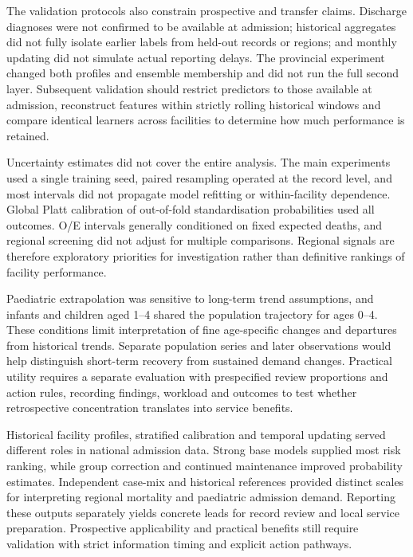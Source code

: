 \documentclass[11pt,a4paper]{article}
\newcommand{\mainheading}[1]{\par\needspace{4\baselineskip}\vspace{7pt}{\large\bfseries #1}\par\vspace{3pt}}
\begin{document}
The validation protocols also constrain prospective and transfer claims. Discharge diagnoses were not confirmed to be available at admission; historical aggregates did not fully isolate earlier labels from held-out records or regions; and monthly updating did not simulate actual reporting delays. The provincial experiment changed both profiles and ensemble membership and did not run the full second layer. Subsequent validation should restrict predictors to those available at admission, reconstruct features within strictly rolling historical windows and compare identical learners across facilities to determine how much performance is retained.

Uncertainty estimates did not cover the entire analysis. The main experiments used a single training seed, paired resampling operated at the record level, and most intervals did not propagate model refitting or within-facility dependence. Global Platt calibration of out-of-fold standardisation probabilities used all outcomes. O/E intervals generally conditioned on fixed expected deaths, and regional screening did not adjust for multiple comparisons. Regional signals are therefore exploratory priorities for investigation rather than definitive rankings of facility performance.

Paediatric extrapolation was sensitive to long-term trend assumptions, and infants and children aged 1–4 shared the population trajectory for ages 0–4. These conditions limit interpretation of fine age-specific changes and departures from historical trends. Separate population series and later observations would help distinguish short-term recovery from sustained demand changes. Practical utility requires a separate evaluation with prespecified review proportions and action rules, recording findings, workload and outcomes to test whether retrospective concentration translates into service benefits.

\mainheading{7 Conclusion}
Historical facility profiles, stratified calibration and temporal updating served different roles in national admission data. Strong base models supplied most risk ranking, while group correction and continued maintenance improved probability estimates. Independent case-mix and historical references provided distinct scales for interpreting regional mortality and paediatric admission demand. Reporting these outputs separately yields concrete leads for record review and local service preparation. Prospective applicability and practical benefits still require validation with strict information timing and explicit action pathways.
\end{document}
